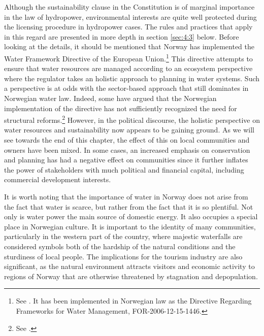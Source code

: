 Although the sustainability clause in the Constitution is of marginal importance in the law of hydropower, environmental interests are quite well protected during the licensing procedure in hydropower cases. The rules and practices that apply in this regard are presented in more depth in section \ref{sec:4:3} below. Before looking at the details, it should be mentioned that Norway has implemented the Water Framework Directive of the European Union.\footnote{See \cite{water00}. It has been implemented in Norwegian law as the Directive Regarding Frameworks for Water Management, FOR-2006-12-15-1446.} This directive attempts to ensure that water resources are managed according to an ecosystem perspective where the regulator takes an holistic approach to planning in water systems. Such a perspective is at odds with the sector-based approach that still dominates in Norwegian water law. Indeed, some have argued that the Norwegian implementation of the directive has not sufficiently recognized the need for structural reforms.\footnote{See \cite{hanssen14}.} However, in the political discourse, the holistic perspective on water resources and sustainability now appears to be gaining ground. As we will see towards the end of this chapter, the effect of this on local communities and owners have been mixed. In some cases, an increased emphasis on conservation and planning has had a negative effect on communities since it further inflates the power of stakeholders with much political and financial capital, including commercial development interests.

It is worth noting that the importance of water in Norway does not arise from the fact that water is scarce, but rather from the fact that it is so plentiful. Not only is water power the main source of domestic energy. It also occupies a special place in Norwegian culture. It is important to the identity of many communities, particularly in the western part of the country, where majestic waterfalls are considered symbols both of the hardship of the natural conditions and the sturdiness of local people. The implications for the tourism industry are also significant, as the natural environment attracts visitors and economic activity to regions of Norway that are otherwise threatened by stagnation and depopulation.

